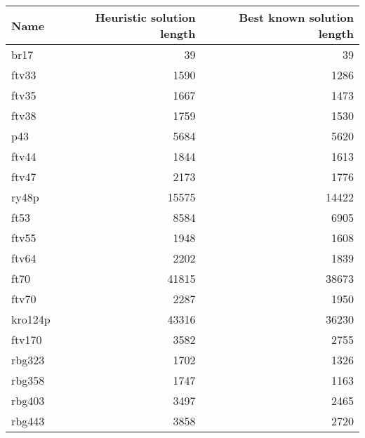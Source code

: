 \begin{table}
\centering
\begin{tabular}{l|r|r}
\hline
Name & Heuristic solution length & Best known solution length\\
\hline
br17 & 39 & 39\\
\hline
ftv33 & 1590 & 1286\\
\hline
ftv35 & 1667 & 1473\\
\hline
ftv38 & 1759 & 1530\\
\hline
p43 & 5684 & 5620\\
\hline
ftv44 & 1844 & 1613\\
\hline
ftv47 & 2173 & 1776\\
\hline
ry48p & 15575 & 14422\\
\hline
ft53 & 8584 & 6905\\
\hline
ftv55 & 1948 & 1608\\
\hline
ftv64 & 2202 & 1839\\
\hline
ft70 & 41815 & 38673\\
\hline
ftv70 & 2287 & 1950\\
\hline
kro124p & 43316 & 36230\\
\hline
ftv170 & 3582 & 2755\\
\hline
rbg323 & 1702 & 1326\\
\hline
rbg358 & 1747 & 1163\\
\hline
rbg403 & 3497 & 2465\\
\hline
rbg443 & 3858 & 2720\\
\hline
\end{tabular}
\end{table}
